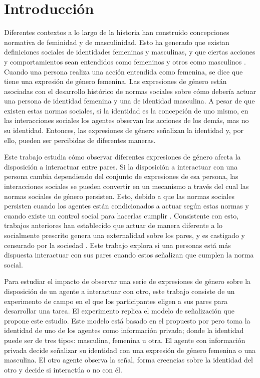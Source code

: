 \section{Introducción}
Diferentes contextos a lo largo de la historia han construido concepciones normativa de feminidad y de masculinidad. Esto ha generado que existan definiciones sociales de identidades femeninas y masculinas, y que ciertas acciones y comportamientos sean entendidos como femeninos y otros como  masculinos \citep{scott2007gender}. Cuando una persona realiza una acción entendida como femenina, se dice que tiene una expresión de género femenina. Las expresiones de género están asociadas con el desarrollo histórico de normas sociales sobre cómo debería actuar una persona de identidad femenina y una de identidad masculina. A pesar de que existen estas normas sociales, si la identidad es la concepción de uno mismo, en las interacciones sociales los agentes observan las acciones de los demás, mas no su identidad. Entonces, las expresiones de género señalizan la identidad y, por ello, pueden ser percibidas de diferentes maneras.

Este trabajo estudia cómo observar diferentes expresiones de género afecta la disposición a interactuar entre pares. Si la disposición a interactuar con una persona cambia dependiendo del conjunto de expresiones de esa persona, las interacciones sociales se pueden convertir en un mecanismo a través del cual las normas sociales de género persisten. Esto, debido a que las normas sociales persisten cuando los agentes están condicionados a actuar según estas normas y cuando existe un control social para hacerlas cumplir \citep{epstein2006similarity}. Consistente con esto, trabajos anteriores han establecido que actuar de manera diferente a lo socialmente prescrito genera una externalidad sobre los pares, y es castigado y censurado por la sociedad \citep{bernheim1994theory,akerlof2000economics}. Este trabajo explora si una personas está más dispuesta interactuar con sus pares cuando estos señalizan que cumplen la norma social. 

Para estudiar el impacto de observar una serie de expresiones de género sobre la disposición de un agente a interactuar con otro, este trabajo consiste de un experimento de campo en el que los participantes eligen a sus pares para desarrollar una tarea. El experimento replica el modelo de señalización que propone este estudio. Este modelo está basado en el propuesto por \cite{akerlof2000economics} pero toma la identidad de uno de los agentes como información privada; donde la identidad puede ser de tres tipos: masculina, femenina u otra. El agente con información privada decide señalizar su identidad con una expresión de género femenina o una masculina. El otro agente observa la señal, forma creencias sobre la identidad del otro y decide si interactúa o no con él. 

